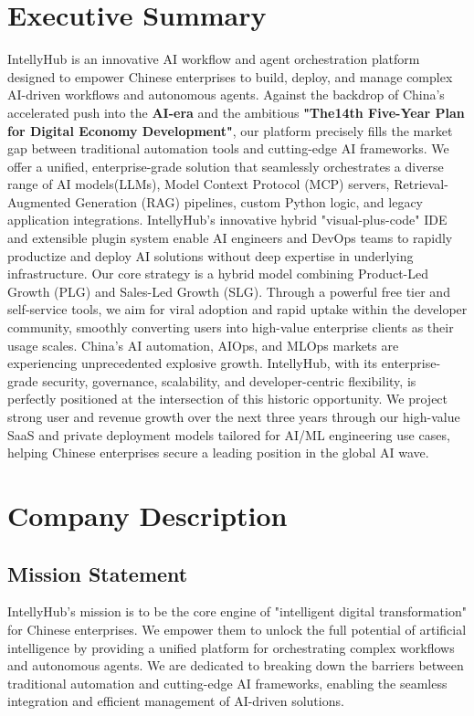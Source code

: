 \documentclass[11pt, a4paper, oneside]{article}
\begin{document}
\section{Executive Summary}
IntellyHub is an innovative AI workflow and agent orchestration platform designed to empower Chinese enterprises to build, deploy, and manage complex AI-driven workflows and autonomous agents. Against the backdrop of China's accelerated push into the \textbf{AI-era} and the ambitious \textbf{"The14th Five-Year Plan for Digital Economy Development"}, our platform precisely fills the market gap between traditional automation tools and cutting-edge AI frameworks.
We offer a unified, enterprise-grade solution that seamlessly orchestrates a diverse range of AI models(LLMs), Model Context Protocol (MCP) servers, Retrieval-Augmented Generation (RAG) pipelines, custom Python logic, and legacy application integrations. IntellyHub's innovative hybrid "visual-plus-code" IDE and extensible plugin system enable AI engineers and DevOps teams to rapidly productize and deploy AI solutions without deep expertise in underlying infrastructure.
Our core strategy is a hybrid model combining Product-Led Growth (PLG) and Sales-Led Growth (SLG). Through a powerful free tier and self-service tools, we aim for viral adoption and rapid uptake within the developer community, smoothly converting users into high-value enterprise clients as their usage scales.
China's AI automation, AIOps, and MLOps markets are experiencing unprecedented explosive growth. IntellyHub, with its enterprise-grade security, governance, scalability, and developer-centric flexibility, is perfectly positioned at the intersection of this historic opportunity. 
We project strong user and revenue growth over the next three years through our high-value SaaS and private deployment models tailored for AI/ML engineering use cases, helping Chinese enterprises secure a leading position in the global AI wave.


\section{Company Description}
\subsection{Mission Statement}
IntellyHub's mission is to be the core engine of "intelligent digital transformation" for Chinese enterprises. We empower them to unlock the full potential of artificial intelligence by providing a unified platform for orchestrating complex workflows and autonomous agents. We are dedicated to breaking down the barriers between traditional automation and cutting-edge AI frameworks, enabling the seamless integration and efficient management of AI-driven solutions.
\end{document}

